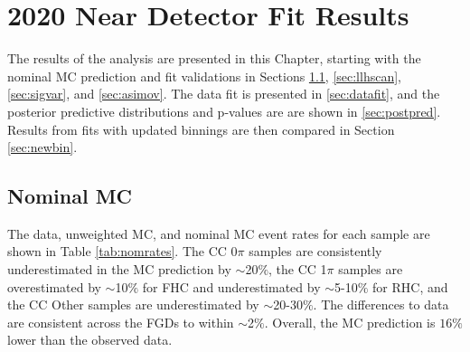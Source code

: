 \chapter{2020 Near Detector Fit Results}\label{sec:2020Fit}

The results of the analysis are presented in this Chapter, starting with the nominal MC prediction and fit validations in Sections \ref{sec:nommc}, \ref{sec:llhscan}, \ref{sec:sigvar}, and \ref{sec:asimov}. The data fit is presented in \ref{sec:datafit}, and the posterior predictive distributions and p-values are are shown in \ref{sec:postpred}. Results from fits with updated binnings are then compared in Section \ref{sec:newbin}.

\section{Nominal MC}\label{sec:nommc}

The data, unweighted MC, and nominal MC event rates for each sample are shown in Table \ref{tab:nomrates}. The CC 0$\pi$ samples are consistently underestimated in the MC prediction by $\sim$20$\%$, the CC 1$\pi$ samples are overestimated by $\sim$10$\%$ for FHC and underestimated by $\sim$5-10$\%$ for RHC, and the CC Other samples are underestimated by $\sim$20-30$\%$. The differences to data are consistent across the FGDs to within $\sim$2$\%$. Overall, the MC prediction is $16\%$ lower than the observed data.

